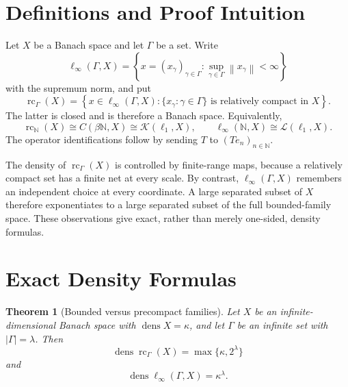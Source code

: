 \documentclass[11pt]{article}
\newtheorem{theorem}{Theorem}
\newcommand{\N}{\mathbb N}
\newcommand{\Kop}{\mathcal K}
\newcommand{\Lop}{\mathcal L}
\newcommand{\dens}{\operatorname{dens}}
\newcommand{\rc}{\operatorname{rc}}
\newcommand{\norm}[1]{\left\lVert #1\right\rVert}
\begin{document}
\section*{Definitions and Proof Intuition}

Let \(X\) be a Banach space and let \(\Gamma\) be a set. Write
\[
 \ell_\infty(\Gamma,X)
 =
 \left\{x=(x_\gamma)_{\gamma\in\Gamma}:
       \sup_{\gamma\in\Gamma}\norm{x_\gamma}<\infty\right\}
\]
with the supremum norm, and put
\[
 \rc_\Gamma(X)
 =
 \left\{x\in\ell_\infty(\Gamma,X):
       \{x_\gamma:\gamma\in\Gamma\}\text{ is relatively compact in }X
 \right\}.
\]
The latter is closed and is therefore a Banach space. Equivalently,
\[
 \rc_\N(X)\cong C(\beta\N,X)\cong\Kop(\ell_1,X),
 \qquad
 \ell_\infty(\N,X)\cong\Lop(\ell_1,X).
 \tag{3}\label{eq:operators}
\]
The operator identifications follow by sending \(T\) to
\((Te_n)_{n\in\N}\).

The density of \(\rc_\Gamma(X)\) is controlled by finite-range maps, because
a relatively compact set has a finite net at every scale. By contrast,
\(\ell_\infty(\Gamma,X)\) remembers an independent choice at every
coordinate. A large separated subset of \(X\) therefore exponentiates to a
large separated subset of the full bounded-family space. These observations
give exact, rather than merely one-sided, density formulas.

\section*{Exact Density Formulas}

\begin{theorem}[Bounded versus precompact families]\label{thm:density}
Let \(X\) be an infinite-dimensional Banach space with
\(\dens X=\kappa\), and let \(\Gamma\) be an infinite set with
\(|\Gamma|=\lambda\). Then
\[
 \dens\rc_\Gamma(X)=\max\{\kappa,2^\lambda\}
 \tag{4}\label{eq:rc-density}
\]
and
\[
 \dens\ell_\infty(\Gamma,X)=\kappa^\lambda.
 \tag{5}\label{eq:bounded-density}
\]
\end{theorem}
\end{document}

